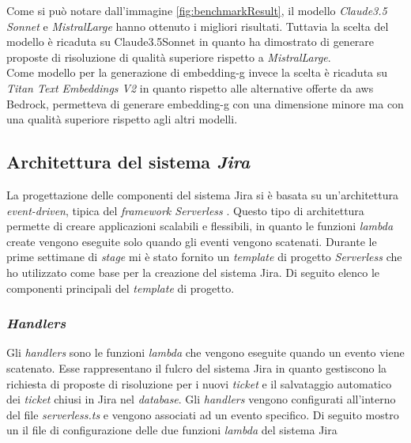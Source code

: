 Come si può notare dall'immagine \ref{fig:benchmarkResult}, il modello \textit{Claude3.5 Sonnet} e \textit{MistralLarge} hanno ottenuto i migliori risultati. Tuttavia la scelta del modello è ricaduta su Claude3.5Sonnet in quanto ha dimostrato di generare proposte di risoluzione di qualità superiore rispetto a \textit{MistralLarge}.\\
Come modello per la generazione di \gls{embedding-g} invece la scelta è ricaduta su \textit{Titan Text Embeddings V2} in quanto rispetto alle alternative offerte da \gls{aws} Bedrock, permetteva di generare \gls{embedding-g} con una dimensione minore ma con una qualità superiore rispetto agli altri modelli.

\subsection{Architettura del sistema \textit{Jira}}
La progettazione delle componenti del sistema Jira si è basata su un'architettura \textit{event-driven}, tipica del \textit{framework Serverless} . Questo tipo di architettura permette di creare applicazioni scalabili e flessibili, in quanto le funzioni \textit{lambda} create vengono eseguite solo quando gli eventi vengono scatenati. 
Durante le prime settimane di \textit{stage} mi è stato fornito un \textit{template} di progetto \textit{Serverless} che ho utilizzato come base per la creazione del sistema Jira. Di seguito elenco le componenti principali del \textit{template} di progetto.

\subsubsection{\textit{Handlers}}
Gli \textit{handlers} sono le funzioni \textit{lambda} che vengono eseguite quando un evento viene scatenato. Esse rappresentano il fulcro del sistema Jira in quanto gestiscono la richiesta di proposte di risoluzione per i nuovi \textit{ticket} e il salvataggio automatico dei \textit{ticket} chiusi in Jira nel \textit{database}. 
Gli \textit{handlers} vengono configurati all'interno del file \textit{serverless.ts} e vengono associati ad un evento specifico. Di seguito mostro un il file di configurazione delle due funzioni \textit{lambda} del sistema Jira

